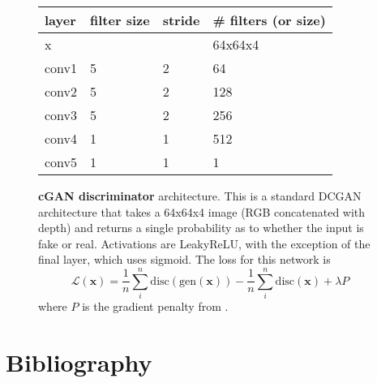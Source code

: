 \documentclass[twoside,11pt,a4paper]{article}
\newcommand{\drawcnnlayer}[7]{
  \path (0,0);
  \begin{scope}[shift={#1}]
  \draw[black,fill=#5] (0,0,0) -- ++(-#2,0,0) -- ++(0,-#3,0) -- ++(#2,0,0) -- cycle;
  \draw[black,fill=#5] (0,0,0) -- ++(0,0,-#4) -- ++(0,-#3,0) -- ++(0,0,#4) -- cycle;
  \draw[black,fill=#5] (0,0,0) -- ++(-#2,0,0) -- ++(0,0,-#4) -- ++(#2,0,0) -- cycle;
  \end{scope}
}
\begin{document}

\begin{figure}
  \begin{center}

     \vspace{1em}

    \begin{tabular}{l||l|l|l}
      layer & filter size & stride & \# filters (or size) \\
      \hline
      x & & & 64x64x4 \\
      conv1 & 5 & 2 & 64 \\
      conv2 & 5 & 2 & 128 \\
      conv3 & 5 & 2 & 256 \\
      conv4 & 1 & 1 & 512 \\
      conv5 & 1 & 1 & 1 \\
    \end{tabular}


  \end{center}
  \caption{\textbf{cGAN discriminator} architecture.
    This is a standard DCGAN architecture that takes a 64x64x4 image (RGB concatenated with depth) and returns a single probability as to whether the input is fake or real.
    Activations are LeakyReLU, with the exception of the final layer, which uses sigmoid.
    The loss for this network is
    \begin{equation}
      \mathcal{L}(\textbf{x}) = \frac{1}{n}\sum_i^n \text{disc}(\text{gen}(\textbf{x})) - \frac{1}{n}\sum_i^n \text{disc}(\textbf{x}) + \lambda P
    \end{equation}
    where $P$ is the gradient penalty from \cite{gulrajani2017improved}.
  }
  \label{fig:cgan-discriminator}
\end{figure}


\newpage
\section{Bibliography}
\printbibliography
\end{document}
